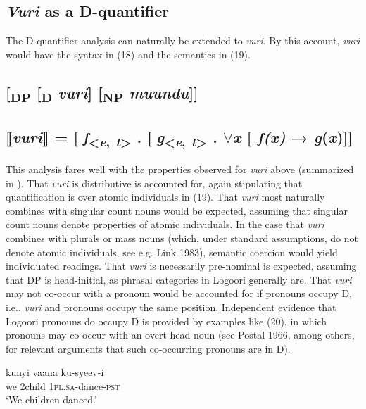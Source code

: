 \documentclass[output=paper]{langsci/langscibook}
\begin{document}
\subsection{\textit{Vuri} as a D-quantifier}

The D-quantifier analysis can naturally be extended to \textit{vuri}. By this account, \textit{vuri} would have the syntax in (18) and the semantics in (19).

\subsection{      [\textsubscript{DP} [\textsubscript{D} \textit{vuri}] [\textsubscript{NP} \textit{muundu}]]}
\subsection{      ⟦\textit{vuri}⟧ = [\textit{f}\textsubscript{<}\textit{\textsubscript{e}}\textsubscript{,} \textit{\textsubscript{t}}\textsubscript{>} . [\textit{g}\textsubscript{<}\textit{\textsubscript{e}}\textsubscript{,} \textit{\textsubscript{t}}\textsubscript{>} . ${\forall}$\textit{x} [ \textit{f(x)} → \textit{g}(\textit{x})]]}

This analysis fares well with the properties observed for \textit{vuri} above (summarized in ). That \textit{vuri} is distributive is accounted for, again stipulating that quantification is over atomic individuals in (19). That \textit{vuri} most naturally combines with singular count nouns would be expected, assuming that singular count nouns denote properties of atomic individuals. In the case that \textit{vuri} combines with plurals or mass nouns (which, under standard assumptions, do not denote atomic individuals, see e.g. Link 1983), semantic coercion would yield individuated readings. That \textit{vuri} is necessarily pre-nominal is expected, assuming that DP is head-initial, as phrasal categories in Logoori generally are. That \textit{vuri} may not co-occur with a pronoun would be accounted for if pronouns occupy D, i.e., \textit{vuri} and pronouns occupy the same position. Independent evidence that Logoori pronouns do occupy D is provided by examples like (20), in which pronouns may co-occur with an overt head noun (see Postal 1966, among others, for relevant arguments that such co-occurring pronouns are in D).

\ea
\gll kunyi  vaana    ku-syeev-i\\
     we  2child    1\textsc{pl}.\textsc{sa}{}-dance-\textsc{pst}  \\
\glt ‘We children danced.’
\z
\end{document}
